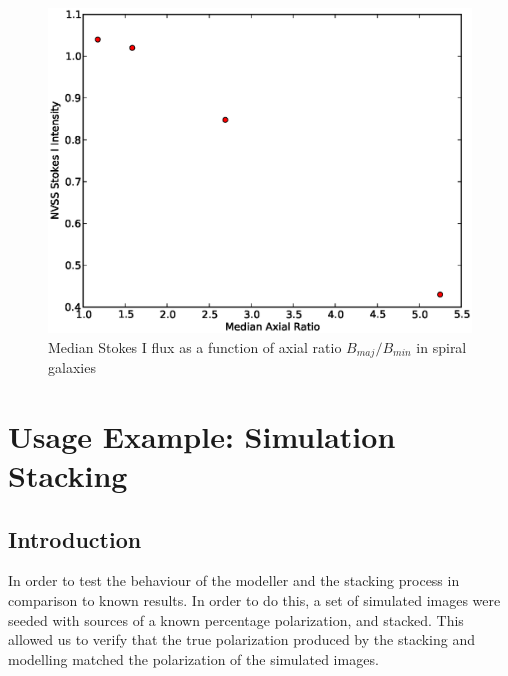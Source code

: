\documentclass{article}
\begin{document}
\begin{figure}[H]
\centering
\includegraphics[scale=0.8]{spiral_axial_ratio.eps}
\caption[Plot of Flux vs. Axial Ratio for spiral galaxies]{Median Stokes I flux
as a function of axial ratio $B_{maj}/B_{min}$ in spiral galaxies}
\end{figure}
\section{Usage Example: Simulation Stacking}

\subsection{Introduction}
In order to test the behaviour of the modeller and the stacking process in 
comparison to known results.  In order to do this, a set of simulated images
were seeded with sources of a known percentage polarization, and stacked.  This
allowed us to verify that the true polarization produced by the stacking and
modelling matched the polarization of the simulated images.
\end{document}
